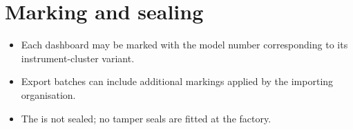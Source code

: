 \chapter{Marking and sealing}\label{ch:marking}

\begin{itemize}
    \item Each dashboard may be marked with the model number corresponding to its instrument-cluster variant.
    \item Export batches can include additional markings applied by the importing organisation.
    \item The \ReplicaGenOne{} is not sealed; no tamper seals are fitted at the factory.
\end{itemize}
